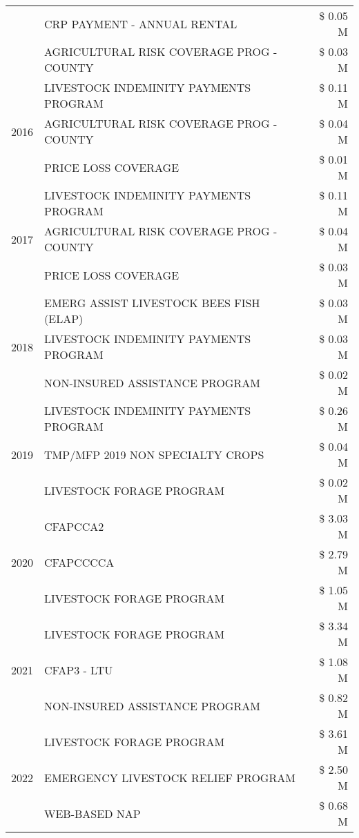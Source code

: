 \begin{tabular}{llr}
 & CRP PAYMENT - ANNUAL RENTAL & \$ 0.05 M \\
 & AGRICULTURAL RISK COVERAGE PROG - COUNTY & \$ 0.03 M \\
\cline{1-3}
\multirow[t]{3}{*}{2016} & LIVESTOCK INDEMINITY PAYMENTS PROGRAM & \$ 0.11 M \\
 & AGRICULTURAL RISK COVERAGE PROG - COUNTY & \$ 0.04 M \\
 & PRICE LOSS COVERAGE & \$ 0.01 M \\
\cline{1-3}
\multirow[t]{3}{*}{2017} & LIVESTOCK INDEMINITY PAYMENTS PROGRAM & \$ 0.11 M \\
 & AGRICULTURAL RISK COVERAGE PROG - COUNTY & \$ 0.04 M \\
 & PRICE LOSS COVERAGE & \$ 0.03 M \\
\cline{1-3}
\multirow[t]{3}{*}{2018} & EMERG ASSIST LIVESTOCK BEES FISH (ELAP) & \$ 0.03 M \\
 & LIVESTOCK INDEMINITY PAYMENTS PROGRAM & \$ 0.03 M \\
 & NON-INSURED ASSISTANCE PROGRAM & \$ 0.02 M \\
\cline{1-3}
\multirow[t]{3}{*}{2019} & LIVESTOCK INDEMINITY PAYMENTS PROGRAM & \$ 0.26 M \\
 & TMP/MFP 2019 NON SPECIALTY CROPS & \$ 0.04 M \\
 & LIVESTOCK FORAGE PROGRAM & \$ 0.02 M \\
\cline{1-3}
\multirow[t]{3}{*}{2020} & CFAPCCA2 & \$ 3.03 M \\
 & CFAPCCCCA & \$ 2.79 M \\
 & LIVESTOCK FORAGE PROGRAM & \$ 1.05 M \\
\cline{1-3}
\multirow[t]{3}{*}{2021} & LIVESTOCK FORAGE PROGRAM & \$ 3.34 M \\
 & CFAP3 - LTU & \$ 1.08 M \\
 & NON-INSURED ASSISTANCE PROGRAM & \$ 0.82 M \\
\cline{1-3}
\multirow[t]{3}{*}{2022} & LIVESTOCK FORAGE PROGRAM & \$ 3.61 M \\
 & EMERGENCY LIVESTOCK RELIEF PROGRAM & \$ 2.50 M \\
 & WEB-BASED NAP & \$ 0.68 M \\
\cline{1-3}
\bottomrule
\end{tabular}
